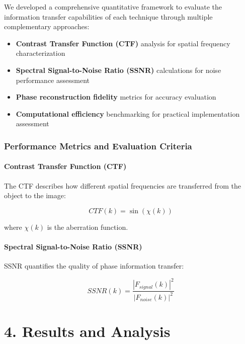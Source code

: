 \documentclass[
  letterpaper,
]{article}
\providecommand{\tightlist}{%
  \setlength{\itemsep}{0pt}\setlength{\parskip}{0pt}}
\begin{document}
We developed a comprehensive quantitative framework to evaluate the
information transfer capabilities of each technique through multiple
complementary approaches:

\begin{itemize}
\tightlist
\item
  \textbf{Contrast Transfer Function (CTF)} analysis for spatial
  frequency characterization
\item
  \textbf{Spectral Signal-to-Noise Ratio (SSNR)} calculations for noise
  performance assessment
\item
  \textbf{Phase reconstruction fidelity} metrics for accuracy evaluation
\item
  \textbf{Computational efficiency} benchmarking for practical
  implementation assessment
\end{itemize}

\subsection{Performance Metrics and Evaluation
Criteria}\label{performance-metrics-and-evaluation-criteria}

\subsubsection{Contrast Transfer Function
(CTF)}\label{contrast-transfer-function-ctf}

The CTF describes how different spatial frequencies are transferred from
the object to the image:

\[
CTF(k) = \sin(\chi(k))
\]

where \(\chi(k)\) is the aberration function.

\subsubsection{Spectral Signal-to-Noise Ratio
(SSNR)}\label{spectral-signal-to-noise-ratio-ssnr}

SSNR quantifies the quality of phase information transfer:

\[
SSNR(k) = \frac{|F_{signal}(k)|^2}{|F_{noise}(k)|^2}
\]


\chapter{4. Results and Analysis}\label{results-and-analysis-1}
\end{document}
